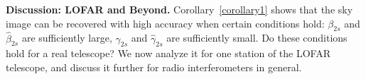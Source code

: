 \documentclass[aoas,preprint]{imsart}
\numberwithin{equation}{section}
\theoremstyle{plain}
\begin{document}

{\bf Discussion: LOFAR and Beyond.}
Corollary~\ref{corollary1} shows that the sky image 
can be recovered with high accuracy when certain conditions  hold:
${\beta}_{2s}$ and $\hat{\beta}_{2s}$ are sufficiently large, ${\gamma}_{2s}$ and $\hat{\gamma}_{2s}$
are sufficiently small. Do these conditions hold for a real telescope? We now analyze it for one station of the LOFAR telescope, and discuss it further for radio interferometers in general.

\vspace{0.5em}
\end{document}
